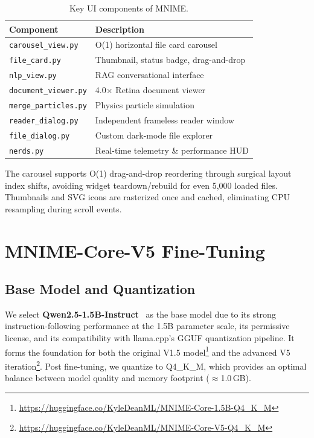 \documentclass[11pt]{article}
\begin{document}
\begin{table}[h!]
\centering
\small
\begin{tabular}{@{}p{3.0cm}p{4.2cm}@{}}
\toprule
\textbf{Component} & \textbf{Description} \\
\midrule
\texttt{carousel\_view.py} & O(1) horizontal file card carousel \\
\texttt{file\_card.py} & Thumbnail, status badge, drag-and-drop \\
\texttt{nlp\_view.py} & RAG conversational interface \\
\texttt{document\_viewer.py} & 4.0$\times$ Retina document viewer \\
\texttt{merge\_particles.py} & Physics particle simulation \\
\texttt{reader\_dialog.py} & Independent frameless reader window \\
\texttt{file\_dialog.py} & Custom dark-mode file explorer \\
\texttt{nerds.py} & Real-time telemetry \& performance HUD \\
\bottomrule
\end{tabular}
\caption{Key UI components of MNIME.}
\label{tab:ui_components}
\end{table}

The carousel supports O(1) drag-and-drop reordering through surgical layout
index shifts, avoiding widget teardown/rebuild for even 5,000 loaded files.
Thumbnails and SVG icons are rasterized once and cached, eliminating CPU
resampling during scroll events.

\section{MNIME-Core-V5 Fine-Tuning}
\label{sec:model}

\subsection{Base Model and Quantization}

We select \textbf{Qwen2.5-1.5B-Instruct}~\cite{qwen2025} as the base model
due to its strong instruction-following performance at the 1.5B parameter scale,
its permissive license, and its compatibility with llama.cpp's GGUF
quantization pipeline. It forms the foundation for both the original V1.5 model\footnote{\url{https://huggingface.co/KyleDeanML/MNIME-Core-1.5B-Q4_K_M}} and the advanced V5 iteration\footnote{\url{https://huggingface.co/KyleDeanML/MNIME-Core-V5-Q4_K_M}}.
Post fine-tuning, we quantize to Q4\_K\_M, which provides an optimal balance
between model quality and memory footprint ($\approx$1.0\,GB).
\end{document}
